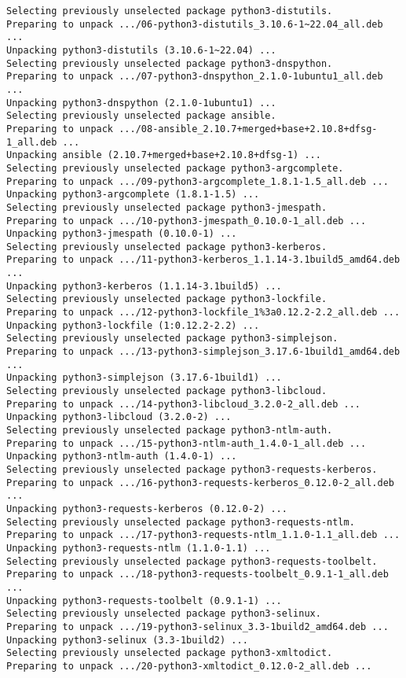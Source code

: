 \documentclass[../main.tex]{subfiles}
\begin{document}
\begin{lstlisting}
Selecting previously unselected package python3-distutils.
Preparing to unpack .../06-python3-distutils_3.10.6-1~22.04_all.deb ...
Unpacking python3-distutils (3.10.6-1~22.04) ...
Selecting previously unselected package python3-dnspython.
Preparing to unpack .../07-python3-dnspython_2.1.0-1ubuntu1_all.deb ...
Unpacking python3-dnspython (2.1.0-1ubuntu1) ...
Selecting previously unselected package ansible.
Preparing to unpack .../08-ansible_2.10.7+merged+base+2.10.8+dfsg-1_all.deb ...
Unpacking ansible (2.10.7+merged+base+2.10.8+dfsg-1) ...
Selecting previously unselected package python3-argcomplete.
Preparing to unpack .../09-python3-argcomplete_1.8.1-1.5_all.deb ...
Unpacking python3-argcomplete (1.8.1-1.5) ...
Selecting previously unselected package python3-jmespath.
Preparing to unpack .../10-python3-jmespath_0.10.0-1_all.deb ...
Unpacking python3-jmespath (0.10.0-1) ...
Selecting previously unselected package python3-kerberos.
Preparing to unpack .../11-python3-kerberos_1.1.14-3.1build5_amd64.deb ...
Unpacking python3-kerberos (1.1.14-3.1build5) ...
Selecting previously unselected package python3-lockfile.
Preparing to unpack .../12-python3-lockfile_1%3a0.12.2-2.2_all.deb ...
Unpacking python3-lockfile (1:0.12.2-2.2) ...
Selecting previously unselected package python3-simplejson.
Preparing to unpack .../13-python3-simplejson_3.17.6-1build1_amd64.deb ...
Unpacking python3-simplejson (3.17.6-1build1) ...
Selecting previously unselected package python3-libcloud.
Preparing to unpack .../14-python3-libcloud_3.2.0-2_all.deb ...
Unpacking python3-libcloud (3.2.0-2) ...
Selecting previously unselected package python3-ntlm-auth.
Preparing to unpack .../15-python3-ntlm-auth_1.4.0-1_all.deb ...
Unpacking python3-ntlm-auth (1.4.0-1) ...
Selecting previously unselected package python3-requests-kerberos.
Preparing to unpack .../16-python3-requests-kerberos_0.12.0-2_all.deb ...
Unpacking python3-requests-kerberos (0.12.0-2) ...
Selecting previously unselected package python3-requests-ntlm.
Preparing to unpack .../17-python3-requests-ntlm_1.1.0-1.1_all.deb ...
Unpacking python3-requests-ntlm (1.1.0-1.1) ...
Selecting previously unselected package python3-requests-toolbelt.
Preparing to unpack .../18-python3-requests-toolbelt_0.9.1-1_all.deb ...
Unpacking python3-requests-toolbelt (0.9.1-1) ...
Selecting previously unselected package python3-selinux.
Preparing to unpack .../19-python3-selinux_3.3-1build2_amd64.deb ...
Unpacking python3-selinux (3.3-1build2) ...
Selecting previously unselected package python3-xmltodict.
Preparing to unpack .../20-python3-xmltodict_0.12.0-2_all.deb ...

\end{lstlisting}
\end{document}
